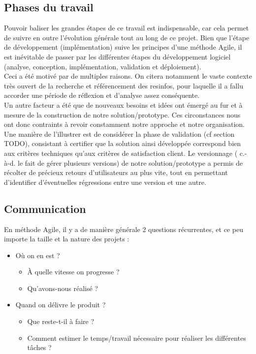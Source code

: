 \subsection*{Phases du travail}

Pouvoir baliser les grandes étapes de ce travail est indispensable, car cela permet de suivre en outre l'évolution générale tout au long de ce projet. Bien que l'étape de développement (implémentation) suive les principes d'une méthode Agile\cite{agileManifeste}, il est inévitable de passer par les différentes étapes du développement logiciel (analyse, conception, implémentation, validation et déploiement). \\

Ceci a été motivé par de multiples raisons. On citera notamment le vaste contexte très ouvert de la recherche et référencement des \glspl{resinfo}, pour laquelle il a fallu accorder une période de réflexion et d'analyse assez conséquente. \\

Un autre facteur a été que de nouveaux besoins et idées ont émergé au fur et à mesure de la construction de notre solution/prototype. Ces circonstances nous ont donc contraints à revoir constamment notre approche et notre organisation. 
Une manière de l'illustrer est de considérer la phase de validation (cf section TODO), consistant à certifier que la solution ainsi développée correspond bien aux critères techniques qu'aux critères de satisfaction client. Le versionnage ( c.-à-d. le fait de gérer plusieurs versions) de notre solution/prototype a permis de récolter de précieux retours d'utilisateurs au plus vite, tout en permettant d'identifier d'éventuelles régressions entre une version et une autre. \\

\subsection*{Communication}

En méthode Agile\cite{agileManifeste}, il y a de manière générale 2 questions récurrentes, et ce peu importe la taille et la nature des projets :
\begin{itemize}
    \item Où on en est ? 
    \begin{itemize}
        \item À quelle vitesse on progresse ?
        \item Qu'avons-nous réalisé ?
    \end{itemize}
    \item Quand on délivre le produit ?
    \begin{itemize}
        \item Que reste-t-il à faire ?
        \item Comment estimer le temps/travail nécessaire pour réaliser les différentes tâches ?
    \end{itemize}
\end{itemize}

